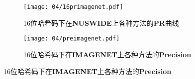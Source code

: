   \begin{figure}[!htp]
    \centering
    \begin{subfigure}{\textwidth}
      \centering
      \texttt{[image: 04/16primagenet.pdf]}
      \caption{16位哈希码下在\textbf{NUSWIDE}上各种方法的\textbf{PR}曲线}
    \end{subfigure}
    \hspace{1cm}
    \begin{subfigure}{\textwidth}
      \centering
      \texttt{[image: 04/preimagenet.pdf]}
      \caption{16位哈希码下在\textbf{IMAGENET}上各种方法的\textbf{Precision}}
    \end{subfigure}
    \label{fig:imagenet}
  \end{figure}
